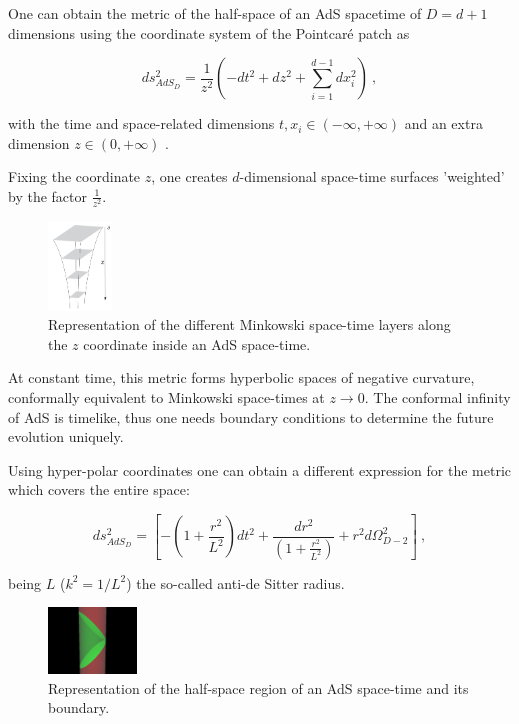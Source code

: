 \documentclass[lettersize,journal]{IEEEtran}
\providecommand{\eq}[2]{
    \begin{equation}
        #2
    \label{eq:#1}
    \end{equation}
}
\begin{document}
One can obtain the metric of the half-space of an AdS spacetime of $D=d+1$ dimensions using the coordinate system of the Pointcaré patch as
\eq{AdS_PP-metric}{
    ds_{AdS_D}^2 = \frac{1}{z^2} \left( -dt^2 + dz^2 + \sum_{i=1}^{d-1} dx_i^2 \right) \ ,
}
with the time and space-related dimensions $t , x_i \in (-\infty,+\infty)$ and an extra dimension $z \in (0,+\infty)$ \cite{kaplan_lectures_nodate}.

Fixing the coordinate $z$, one creates $d$-dimensional space-time surfaces 'weighted' by the factor $\frac{1}{z^2}$.

\begin{figure}
    \centering
    \includegraphics[width=0.15\textwidth]{../Imatges/Extern/Captura_Superficies_z.png}
\caption{Representation of the different Minkowski space-time layers along the $z$ coordinate inside an AdS space-time.}
\label{fig:AdS_z-surfaces}
\end{figure}

At constant time, \cite{} this metric forms hyperbolic spaces of negative curvature, conformally equivalent to Minkowski space-times at $z \to 0$. The conformal infinity of AdS is timelike, thus one needs boundary conditions to determine the future evolution uniquely.

Using hyper-polar coordinates one can obtain a different expression for the metric which covers the entire space:
\eq{AdS_hyper-polar-metric}{
    ds_{AdS_D}^2 = \left [ - \left ( 1 + \frac{r^2}{L^2} \right ) dt^2 + \frac{dr^2}{\left ( 1+ \frac{r^2}{L^2} \right )} + r^2 d \Omega_{D-2}^2 \right ] \ ,
}
being $L$ ($k^2=1/L^2$) the so-called anti-de Sitter radius.

\begin{figure}
    \centering
    \includegraphics[width=0.21\textwidth]{../Imatges/Extern/Wikipedia_Half-space_Cilindric.png}
\caption{Representation of the half-space region of an AdS space-time and its boundary.}
\label{fig:AdS_cylindrical}
\end{figure}
\end{document}
